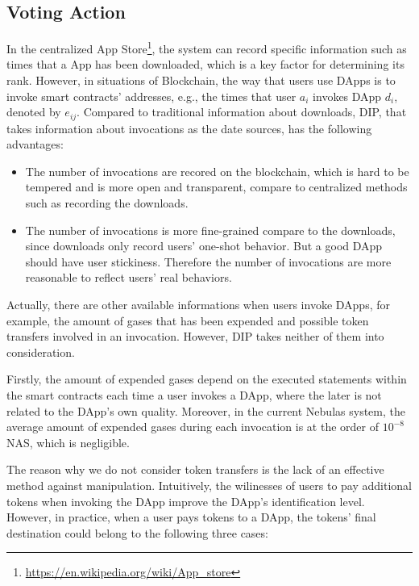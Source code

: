  \subsection{Voting Action}
 \label{subsection:voting}
  In the centralized App Store\footnote{\url{https://en.wikipedia.org/wiki/App\_store}}, the system can record specific information such as times that a App has been downloaded, which is a key factor for determining its rank. However, in situations of Blockchain, the way that users use DApps is to invoke smart contracts' addresses, e.g., the times that user $a_i$ invokes DApp $d_i$, denoted by  $e_{ij}$. Compared to traditional information about downloads, DIP, that takes information about invocations as the date sources, has the following advantages:

 \begin{itemize}
 	\item The number of invocations are recored on the blockchain, which is hard to be tempered and is more open and transparent, compare to centralized methods such as recording the downloads.
 	\item The number of invocations is more fine-grained compare to the downloads, since downloads only record users' one-shot behavior. But a good DApp should have user stickiness. Therefore the number of invocations are more reasonable to reflect users' real behaviors.

\end{itemize}

 Actually, there are other available informations when users invoke DApps, for example, the amount of gases that has been expended and possible token transfers involved in an invocation. However, DIP takes neither of them into consideration.

 Firstly, the amount of expended gases depend on the executed statements within the smart contracts each time a user invokes a DApp, where the later is not related to the DApp's own quality. Moreover, in the current Nebulas system, the average amount of expended gases during each invocation is at the order of $10^{-8}$ NAS, which is negligible.

 The reason why we do not consider token transfers is the lack of an effective method against manipulation. Intuitively, the wilinesses of users to pay additional tokens when invoking the DApp improve the DApp's {\color{red} identification level}.
  However, in practice, when a user pays tokens to a DApp, the tokens' final destination could belong to the following three cases:

